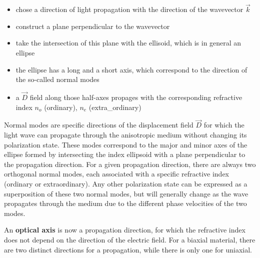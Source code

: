 \documentclass[
  a4paper,
]{book}
\providecommand{\tightlist}{%
  \setlength{\itemsep}{0pt}\setlength{\parskip}{0pt}}
\begin{document}
\begin{itemize}
\tightlist
\item
  chose a direction of light propagation with the direction of the
  wavevector \(\vec{k}\)
\item
  construct a plane perpendicular to the wavevector
\item
  take the intersection of this plane with the ellisoid, which is in
  general an ellipse
\item
  the ellipse has a long and a short axis, which correspond to the
  direction of the so-called normal modes
\item
  a \(\vec{D}\) field along those half-axes propages with the
  corresponding refractive index \(n_o\) (ordinary), \(n_e\)
  (extra\_ordinary)
\end{itemize}

\begin{tcolorbox}[enhanced jigsaw, coltitle=black, title=\textcolor{quarto-callout-note-color}{\faInfo}\hspace{0.5em}{Normal Modes in Anisotropic Materials}, colframe=quarto-callout-note-color-frame, toprule=.15mm, opacitybacktitle=0.6, left=2mm, opacityback=0, breakable, toptitle=1mm, bottomtitle=1mm, leftrule=.75mm, arc=.35mm, titlerule=0mm, colbacktitle=quarto-callout-note-color!10!white, rightrule=.15mm, bottomrule=.15mm, colback=white]

Normal modes are specific directions of the displacement field
\(\vec{D}\) for which the light wave can propagate through the
anisotropic medium without changing its polarization state. These modes
correspond to the major and minor axes of the ellipse formed by
intersecting the index ellipsoid with a plane perpendicular to the
propagation direction. For a given propagation direction, there are
always two orthogonal normal modes, each associated with a specific
refractive index (ordinary or extraordinary). Any other polarization
state can be expressed as a superposition of these two normal modes, but
will generally change as the wave propagates through the medium due to
the different phase velocities of the two modes.

\end{tcolorbox}

An \textbf{optical axis} is now a propagation direction, for which the
refractive index does not depend on the direction of the electric field.
For a biaxial material, there are two distinct directions for a
propagation, while there is only one for uniaxial.
\end{document}
